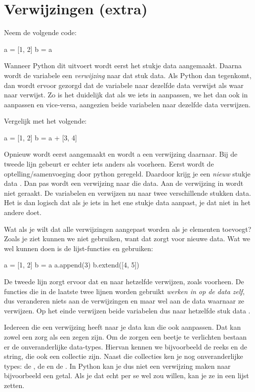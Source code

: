 \section{Verwijzingen (extra)}\label{sec:pointers}
  Neem de volgende code:
  \begin{python}
    a = [1, 2]
    b = a
  \end{python}
  Wanneer Python dit uitvoert wordt eerst het stukje data \py{[1, 2]}
  aangemaakt. Daarna wordt de variabele  een \emph{verwijzing} naar dat
  stuk data. Als Python dan  tegenkomt, dan wordt ervoor gezorgd dat
  de variabele  naar dezelfde data verwijst als waar  naar verwijst.
  Zo is het duidelijk dat als we iets in  aanpassen, we het dan ook in
   aanpassen en vice-versa, aangezien beide variabelen naar dezelfde data
  verwijzen.

  Vergelijk met het volgende:
  \begin{python}
    a = [1, 2]
    b = a + [3, 4]
  \end{python}
  Opnieuw wordt eerst \py{[1, 2]} aangemaakt en wordt a een verwijzing daarnaar.
  Bij de tweede lijn gebeurt er echter iets anders als voorheen. Eerst wordt de
  optelling/samenvoeging door python geregeld. Daardoor krijg je een
  \emph{nieuw} stukje data \py{[1, 2, 3, 4]}. Dan pas wordt  een
  verwijzing naar die data. Aan de verwijzing in  wordt niet geraakt. De
  variabelen  en  verwijzen nu naar twee verschillende stukken data.
  Het is dan logisch dat als je iets in het ene stukje data aanpast, je dat niet
  in het andere doet.

  Wat als je wilt dat alle verwijzingen aangepast worden als je elementen
  toevoegt? Zoals je ziet kunnen we \py{+} niet gebruiken, want dat zorgt voor
  nieuwe data. Wat we wel kunnen doen is de lijst-functies  en
   gebruiken:
  \begin{python}
    a = [1, 2]
    b = a
    a.append(3)
    b.extend([4, 5])
  \end{python}
  De tweede lijn zorgt ervoor dat  en  naar hetzelfde verwijzen,
  zoals voorheen. De functies die in de laatste twee lijnen worden gebruikt
  \emph{werken in op de data zelf}, dus veranderen niets aan de verwijzingen
   en  maar wel aan de data waarnaar ze verwijzen. Op het einde
  verwijzen beide variabelen dus naar hetzelfde stuk data \py{[1, 2, 3, 4, 5]}.

  Iedereen die een verwijzing heeft naar je data kan die ook aanpassen. Dat kan
  zowel een zorg als een zegen zijn. Om de zorgen een beetje te verlichten
  bestaan er de onveranderlijke data-types. Hiervan kennen we bijvoorbeeld de
  reeks en de string, die ook een collectie zijn. Naast die collecties
  ken je nog onveranderlijke types: de , de  en de .
  In Python kan je dus niet een verwijzing maken naar bijvoorbeeld een getal.
  Als je dat echt per se wel zou willen, kan je ze in een lijst zetten.

